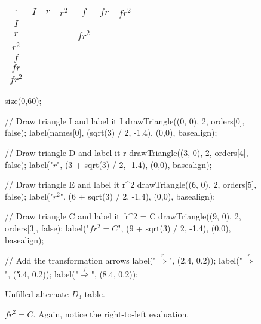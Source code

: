 \documentclass[../textbook.tex]{subfiles}
\begin{document}
\begin{figure}[h]
	\begin{center}
		\begin{minipage}[b]{0.35\textwidth}
			\centering
			\begin{tabular}{c|cccccc}
				\hline
				$\cdot$ & $I$ & $r$ & $r^2$ & $f$ & $fr$ & $fr^2$ \\ \hline
				\rowcolor{light-gray}
				$I$    &   &   &   &   &   &   \\
				$r$    &   &   &   & $fr^2$  &   &   \\
				\rowcolor{light-gray}
				$r^2$    &   &   &   &   &   &   \\
				$f$    &   &   &   &   &   &   \\
				\rowcolor{light-gray}
				$fr$    &   &   &   &   &   &   \\
				$fr^2$    &   &   &   &   &   &   \\ \hline
			\end{tabular}
			\vspace*{0.5\baselineskip}
		\end{minipage}
		\hfill
		\begin{minipage}[b]{0.55\textwidth}
			\centering
			\begin{asy}[width=\textwidth]
			size(0,60);

			// Draw triangle I and label it I
			drawTriangle((0, 0), 2, orders[0], false);
			label(names[0], (sqrt(3) / 2, -1.4), (0,0), basealign);

			// Draw triangle D and label it r
			drawTriangle((3, 0), 2, orders[4], false);
			label("$r$", (3 + sqrt(3) / 2, -1.4), (0,0), basealign);

			// Draw triangle E and label it r^2
			drawTriangle((6, 0), 2, orders[5], false);
			label("$r^2$", (6 + sqrt(3) / 2, -1.4), (0,0), basealign);

			// Draw triangle C and label it fr^2 = C
			drawTriangle((9, 0), 2, orders[3], false);
			label("$fr^2=C$", (9 + sqrt(3) / 2, -1.4), (0,0), basealign);

			// Add the transformation arrows
			label("$\stackrel{r}{\Longrightarrow}$", (2.4, 0.2));
			label("$\stackrel{r}{\Longrightarrow}$", (5.4, 0.2));
			label("$\stackrel{f}{\Longrightarrow}$", (8.4, 0.2));
			\end{asy}
		\end{minipage}
	\end{center}
	\vspace*{-2\baselineskip}
	\begin{center}
		\begin{minipage}[t]{0.35\textwidth}
			\caption{Unfilled alternate $D_3$ table.}
			\label{fig:alttable}
		\end{minipage}
		\hfill
		\begin{minipage}[t]{0.55\textwidth}
			\caption{$fr^2=C$. Again, notice the right-to-left evaluation.}
			\label{fig:fr2}
		\end{minipage}
	\end{center}
	\vspace*{-2\baselineskip}
\end{figure}
\end{document}
